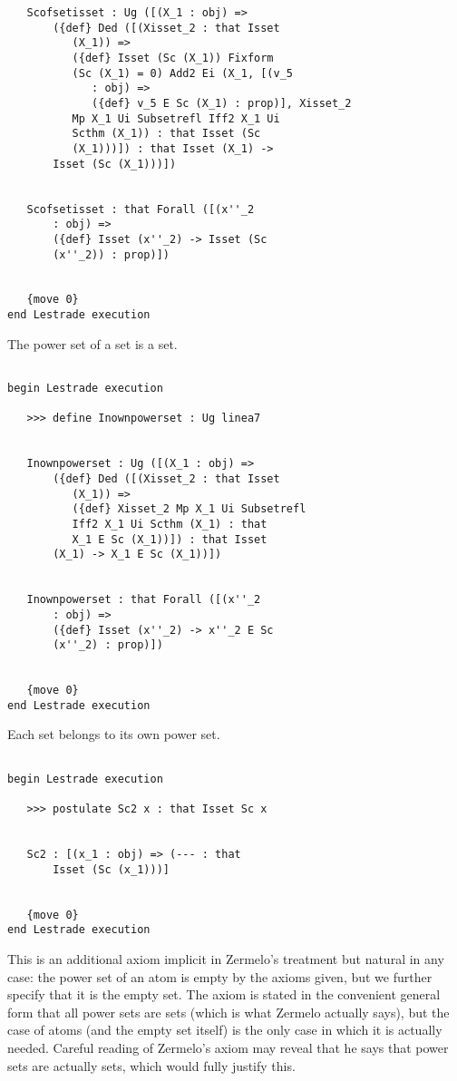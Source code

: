 \documentclass[12pt]{article}
\begin{document}
\begin{verbatim}
   Scofsetisset : Ug ([(X_1 : obj) => 
       ({def} Ded ([(Xisset_2 : that Isset 
          (X_1)) => 
          ({def} Isset (Sc (X_1)) Fixform 
          (Sc (X_1) = 0) Add2 Ei (X_1, [(v_5 
             : obj) => 
             ({def} v_5 E Sc (X_1) : prop)], Xisset_2 
          Mp X_1 Ui Subsetrefl Iff2 X_1 Ui 
          Scthm (X_1)) : that Isset (Sc 
          (X_1)))]) : that Isset (X_1) -> 
       Isset (Sc (X_1)))])


   Scofsetisset : that Forall ([(x''_2 
       : obj) => 
       ({def} Isset (x''_2) -> Isset (Sc 
       (x''_2)) : prop)])


   {move 0}
end Lestrade execution
\end{verbatim}

The power set of a set is a set.

\begin{verbatim}

begin Lestrade execution

   >>> define Inownpowerset : Ug linea7


   Inownpowerset : Ug ([(X_1 : obj) => 
       ({def} Ded ([(Xisset_2 : that Isset 
          (X_1)) => 
          ({def} Xisset_2 Mp X_1 Ui Subsetrefl 
          Iff2 X_1 Ui Scthm (X_1) : that 
          X_1 E Sc (X_1))]) : that Isset 
       (X_1) -> X_1 E Sc (X_1))])


   Inownpowerset : that Forall ([(x''_2 
       : obj) => 
       ({def} Isset (x''_2) -> x''_2 E Sc 
       (x''_2) : prop)])


   {move 0}
end Lestrade execution
\end{verbatim}

Each set belongs to its own power set.

\begin{verbatim}

begin Lestrade execution

   >>> postulate Sc2 x : that Isset Sc x


   Sc2 : [(x_1 : obj) => (--- : that 
       Isset (Sc (x_1)))]


   {move 0}
end Lestrade execution
\end{verbatim}

This is an additional axiom implicit in Zermelo's treatment but natural in any case:  the power set of an atom is empty by the axioms given, but we further
specify that it is the empty set.  The axiom is stated in the convenient general form that all power sets are sets (which is what Zermelo actually says), but the case of atoms (and the empty set itself)
is the only case in which it is actually needed.  Careful reading of Zermelo's axiom may reveal that he says that power sets are actually sets, which would fully justify this.
\end{document}
